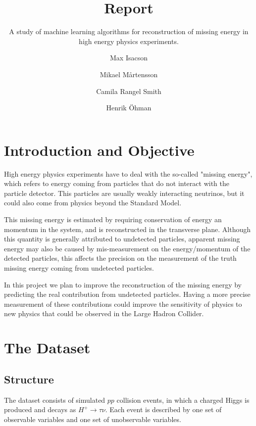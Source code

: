 \documentclass[twocolumn]{scrartcl}
\title{Report}
\subtitle{A study of machine learning algorithms for reconstruction of missing energy in high energy physics experiments.}
\author[1]{Max Isacson}
\author[2]{Mikael M\aa rtensson}
\author[3]{Camila Rangel Smith}
\author[4]{Henrik \"{O}hman}
\affil[1]{\url{max.isacson@physics.uu.se}}
\affil[2]{\url{mikael.martensson@physics.uu.se}}
\affil[3]{\url{camila.rangel@physics.uu.se}}
\affil[4]{\url{ohman@cern.ch}}
\begin{document}
\maketitle


\section{Introduction and Objective}

High energy physics experiments have to deal with the so-called "missing energy", which refers to energy coming from particles that do not interact with the particle detector. This particles are usually weakly interacting neutrinos, but it could also come from physics beyond the Standard Model.

This missing energy is estimated by requiring conservation of energy an momentum in the system, and is reconstructed in the transverse plane.  Although this quantity is generally attributed to undetected particles, apparent missing energy may also be caused by mis-measurement on the energy/momentum of the detected particles, this affects the precision on the measurement of the truth missing energy coming from undetected particles. 

In this project we plan to improve the reconstruction of the missing energy by predicting the real contribution from undetected particles. Having a more precise measurement of these contributions could improve the sensitivity of physics to new physics that could be observed in the Large Hadron Collider. 

\section{The Dataset}
\subsection{Structure}
The dataset consists of simulated $pp$ collision events, in which a charged Higgs is produced and decays as $H^+\to\tau\nu$. Each event is described by one set of observable variables and one set of unobservable variables.
\end{document}
